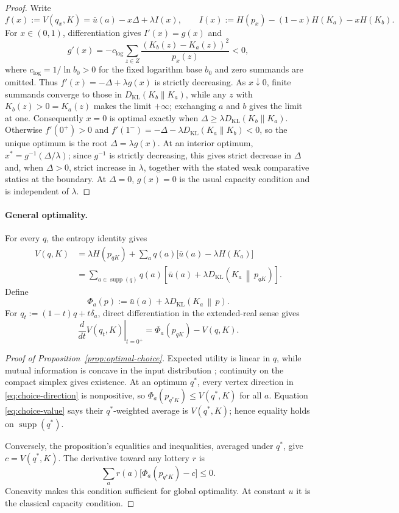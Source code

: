 \documentclass[11pt,a4paper]{article}
\theoremstyle{definition}
\newcommand{\Sh}{H}
\newcommand{\supp}{\operatorname{supp}}
\newcommand{\KL}{D_{\mathrm{KL}}}
\newcommand{\1}{\mathbf 1}
\begin{document}
\begin{proof}
Write
\[
 f(x):=V(q_x,K)=\bar u(a)-x\Delta+\lambda I(x),
 \qquad
 I(x):=\Sh(p_x)-(1-x)\Sh(K_a)-x\Sh(K_b).
\]
For $x\in(0,1)$, differentiation gives $I'(x)=g(x)$ and
\[
 g'(x)
 =-c_{\log}\sum_{z\in Z}\frac{(K_b(z)-K_a(z))^2}{p_x(z)}<0,
\]
where $c_{\log}=1/\ln b_0>0$ for the fixed logarithm base $b_0$
and zero summands are omitted.  Thus $f'(x)=-\Delta+\lambda g(x)$ is strictly
decreasing.  As $x\downarrow0$, finite summands converge to those in
$\KL(K_b\|K_a)$, while any $z$ with $K_b(z)>0=K_a(z)$ makes the limit
$+\infty$; exchanging $a$ and $b$ gives the limit at one.  Consequently
$x=0$ is optimal exactly when
$\Delta\ge\lambda\KL(K_b\|K_a)$.  Otherwise $f'(0^+)>0$ and
$f'(1^-)=-\Delta-\lambda\KL(K_a\|K_b)<0$, so the unique optimum is the
root $\Delta=\lambda g(x)$.  At an interior optimum,
$x^*=g^{-1}(\Delta/\lambda)$; since $g^{-1}$ is strictly decreasing, this
gives strict decrease in $\Delta$ and, when $\Delta>0$, strict increase in
$\lambda$, together with the stated weak comparative statics at the boundary.
At $\Delta=0$, $g(x)=0$ is the usual capacity condition and is independent
of $\lambda$.
\end{proof}

\paragraph{General optimality.}
For every $q$, the entropy identity gives
\begin{equation}\label{eq:choice-value}
 \begin{aligned}
 V(q,K)
 &=\lambda\Sh(p_{qK})
   +\sum_aq(a)\bigl[\bar u(a)-\lambda\Sh(K_a)\bigr] \\
 &=\sum_{a\in\supp(q)}q(a)
   \left[\bar u(a)+\lambda
   \KL\!\left(K_a\,\middle\|\,p_{qK}\right)\right].
 \end{aligned}
\end{equation}
Define
\[
 \Phi_a(p):=\bar u(a)+\lambda\KL\!\left(K_a\,\middle\|\,p\right).
\]
For $q_t:=(1-t)q+t\delta_a$, direct differentiation in the extended-real
sense gives
\begin{equation}\label{eq:choice-direction}
 \left.\frac{d}{dt}V(q_t,K)\right|_{t=0^+}
 =\Phi_a(p_{qK})-V(q,K).
\end{equation}

\begin{proof}[Proof of Proposition~\ref{prop:optimal-choice}]
Expected utility is linear in $q$, while mutual information is concave in
the input distribution \cite{CoverThomas2006}; continuity on the compact
simplex gives existence.  At an optimum $q^*$, every vertex direction in
\eqref{eq:choice-direction} is nonpositive, so
$\Phi_a(p_{q^*K})\le V(q^*,K)$ for all $a$.  Equation
\eqref{eq:choice-value} says their $q^*$-weighted average is $V(q^*,K)$;
hence equality holds on $\supp(q^*)$.

Conversely, the proposition's equalities and inequalities, averaged under
$q^*$, give $c=V(q^*,K)$.  The derivative toward any lottery $r$ is
\[
 \sum_a r(a)\bigl[\Phi_a(p_{q^*K})-c\bigr]\le0.
\]
Concavity makes this condition sufficient for global optimality.  At
constant $u$ it is the classical capacity condition.
\end{proof}
\end{document}
